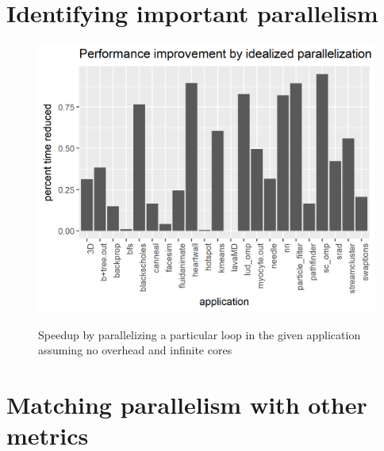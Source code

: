 \documentclass[12pt,twoside]{reedthesis}
\begin{document}
	\section{Identifying important parallelism}
		
		
		
		\begin{figure}
			\caption{}%
			\label{fig:mem-comp-plot-rodinia}
			
			\begin{minipage}{0.73\textwidth} %
				\includegraphics[scale=0.9]{plots/application_idealized_speedup.png}
				{\footnotesize Speedup by parallelizing a particular loop in the given application assuming no overhead and infinite cores\par}
			\end{minipage}
		\end{figure}
	
	\section{Matching parallelism with other metrics}
	
\end{document}
